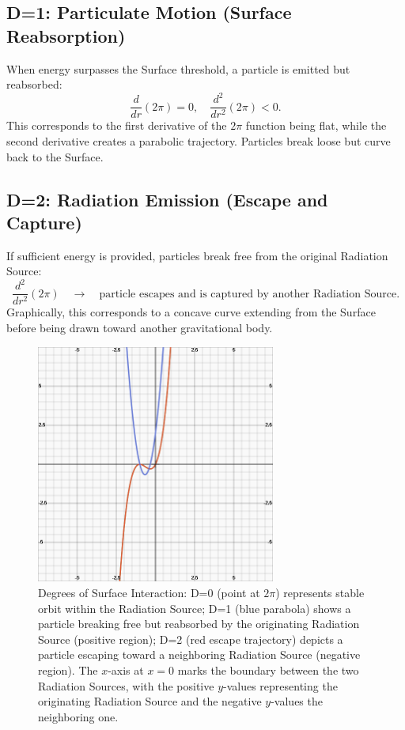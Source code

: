 \documentclass[12pt]{article}
\begin{document}
\subsection{D=1: Particulate Motion (Surface Reabsorption)}
When energy surpasses the Surface threshold, a particle is emitted but reabsorbed:
\[
\frac{d}{dr}(2\pi) = 0, \quad \frac{d^2}{dr^2}(2\pi) < 0.
\]
This corresponds to the first derivative of the $2\pi$ function being flat, while the second derivative creates a parabolic trajectory. Particles break loose but curve back to the Surface.

\subsection{D=2: Radiation Emission (Escape and Capture)}
If sufficient energy is provided, particles break free from the original Radiation Source:
\[
\frac{d^2}{dr^2}(2\pi) \quad \rightarrow \quad \text{particle escapes and is captured by another Radiation Source}.
\]
Graphically, this corresponds to a concave curve extending from the Surface before being drawn toward another gravitational body.

\begin{figure}[h!]
    \centering
    \includegraphics[width=0.7\textwidth]{FirstandSecondDegreeSurfaceInteractions.png} %
    \caption{Degrees of Surface Interaction: D=0 (point at $2\pi$) represents stable orbit within the Radiation Source; D=1 (blue parabola) shows a particle breaking free but reabsorbed by the originating Radiation Source (positive region); D=2 (red escape trajectory) depicts a particle escaping toward a neighboring Radiation Source (negative region). The $x$-axis at $x=0$ marks the boundary between the two Radiation Sources, with the positive $y$-values representing the originating Radiation Source and the negative $y$-values the neighboring one.}
\end{figure}
\end{document}
